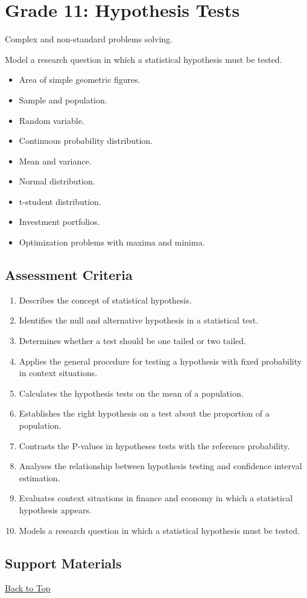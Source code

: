 \section{Grade 11: Hypothesis Tests}\label{sec:grade11-term3-overview}

Complex and non-standard problems solving.

Model a research question in which a statistical hypothesis must be tested.

\begin{itemize}
	\item Area of simple geometric figures.
	\item Sample and population.
	\item Random variable.
	\item Continuous probability distribution.
	\item Mean and variance.
	\item Normal distribution.
	\item t-student distribution.
	\item Investment portfolios.
	\item Optimization problems with maxima and minima.
\end{itemize}

\subsection{Assessment Criteria}\label{sec:grade11-term3-criteria}

\begin{enumerate}
	\item Describes the concept of statistical hypothesis.
	\item Identifies the null and alternative hypothesis in a statistical test.
	\item Determines whether a test should be one tailed or two tailed.
	\item Applies the general procedure for testing a hypothesis with fixed probability in context situations.
	\item Calculates the hypothesis tests on the mean of a population.
	\item Establishes the right hypothesis on a test about the proportion of a population.
	\item Contrasts the P-values in hypotheses tests with the reference probability.
	\item Analyses the relationship between hypothesis testing and confidence interval estimation.
	\item Evaluates context situations in finance and economy in which a statistical hypothesis appears.
	\item Models a research question in which a statistical hypothesis must be tested.
\end{enumerate}

\subsection{Support Materials}\label{sec:grade11-term3-support-materials}

\vspace{6pt}
\noindent\hyperref[table-of-contents]{Back to Top}
